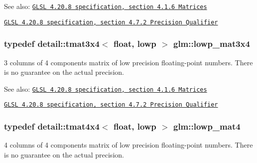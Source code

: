 \begin{Desc}
\item[See also:]\href{http://www.opengl.org/registry/doc/GLSLangSpec.4.20.8.pdf}{\tt GLSL 4.20.8 specification, section 4.1.6 Matrices} 

\href{http://www.opengl.org/registry/doc/GLSLangSpec.4.20.8.pdf}{\tt GLSL 4.20.8 specification, section 4.7.2 Precision Qualifier} \end{Desc}
\hypertarget{group__core__precision_g9cea06e7378fe59abf95c1f56edc4320}{
\subsubsection[lowp\_\-mat3x4]{\setlength{\rightskip}{0pt plus 5cm}typedef detail::tmat3x4$<$ float, lowp $>$ {\bf glm::lowp\_\-mat3x4}}}
\label{group__core__precision_g9cea06e7378fe59abf95c1f56edc4320}


3 columns of 4 components matrix of low precision floating-point numbers. There is no guarantee on the actual precision.

\begin{Desc}
\item[See also:]\href{http://www.opengl.org/registry/doc/GLSLangSpec.4.20.8.pdf}{\tt GLSL 4.20.8 specification, section 4.1.6 Matrices} 

\href{http://www.opengl.org/registry/doc/GLSLangSpec.4.20.8.pdf}{\tt GLSL 4.20.8 specification, section 4.7.2 Precision Qualifier} \end{Desc}
\hypertarget{group__core__precision_g8f6fef75ce51e9d6db7971478ad1f1c2}{
\subsubsection[lowp\_\-mat4]{\setlength{\rightskip}{0pt plus 5cm}typedef detail::tmat4x4$<$ float, lowp $>$ {\bf glm::lowp\_\-mat4}}}
\label{group__core__precision_g8f6fef75ce51e9d6db7971478ad1f1c2}


4 columns of 4 components matrix of low precision floating-point numbers. There is no guarantee on the actual precision.

